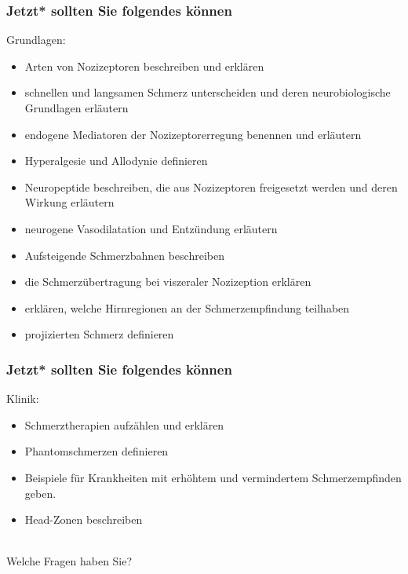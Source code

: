 \documentclass{beamer}
\begin{document}

\begin{frame}


 \frametitle{Jetzt* sollten Sie folgendes können}



\begin{block}{Grundlagen:}




\begin{itemize}

    \item 
    
Arten von Nozizeptoren beschreiben und erklären
    \item 
 schnellen und langsamen Schmerz unterscheiden und deren neurobiologische Grundlagen erläutern
    \item 
 endogene Mediatoren der Nozizeptorerregung benennen und erläutern
    \item 
    Hyperalgesie und Allodynie definieren
    \item 
 Neuropeptide beschreiben, die aus Nozizeptoren freigesetzt werden und deren Wirkung erläutern
    \item 
 neurogene Vasodilatation und Entzündung erläutern
    \item 
 Aufsteigende Schmerzbahnen beschreiben
    \item 
 die Schmerzübertragung bei viszeraler Nozizeption erklären
    \item 
erklären, welche  Hirnregionen an der Schmerzempfindung teilhaben
    \item 
 projizierten Schmerz definieren

\end{itemize}


\end{block}

\end{frame}


\begin{frame}


 \frametitle{Jetzt* sollten Sie folgendes können}
 

\begin{block}{Klinik:}

\begin{itemize}
    
\item 
Schmerztherapien aufzählen und erklären
    \item 
     Phantomschmerzen definieren
    \item 
 Beispiele für Krankheiten mit erhöhtem und vermindertem Schmerzempfinden geben. 
\item
Head-Zonen beschreiben

\end{itemize}


\end{block}


$\,$\\[1cm]
\textcolor{theme}{Welche Fragen haben Sie?}


\end{frame}
\end{document}
